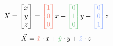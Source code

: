 \documentclass[preview]{standalone}
\begin{document}
$$\vec{X} = \begin{bmatrix}x\\y\\z\end{bmatrix} = \textcolor[HTML]{f59789}{\begin{bmatrix}1\\0\\0\end{bmatrix}} x + \textcolor[HTML]{7dc98c}{\begin{bmatrix}0\\1\\0\end{bmatrix}} y + \textcolor[HTML]{96b1fe}{\begin{bmatrix}0\\0\\1\end{bmatrix}} z$$
$$\vec{X} = \textcolor[HTML]{f59789}{\hat{x}}\cdot x + \textcolor[HTML]{7dc98c}{\hat{y}}\cdot y + \textcolor[HTML]{96b1fe}{\hat{z}}\cdot z$$
\end{document}
